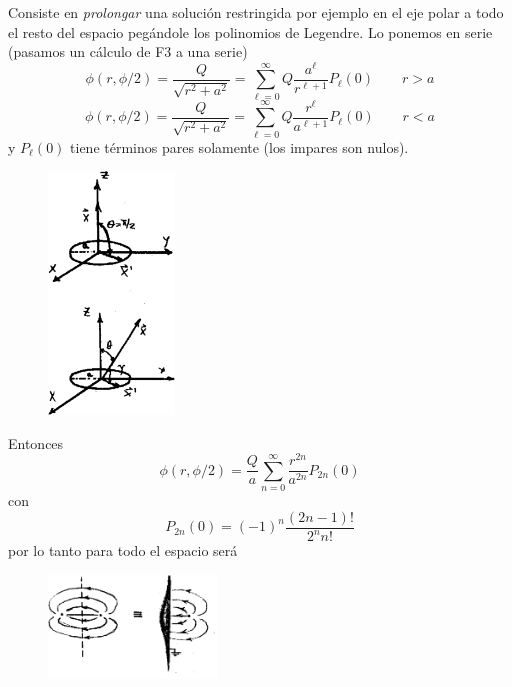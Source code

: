 \documentclass[10pt,oneside]{CBFT_book}
\begin{document}
Consiste en {\it prolongar} una solución restringida por ejemplo en el eje polar a todo el
resto del espacio pegándole los polinomios de Legendre.
Lo ponemos en serie (pasamos un cálculo de F3 a una serie)
\[
	\phi(r,\phi/2) = \frac{Q}{\sqrt{r^2 + a^2}} = \sum_{\ell=0}^\infty Q \frac{a^\ell}{r^{\ell + 1}} 
	P_\ell (0) \qquad r > a
\]
\[
	\phi(r,\phi/2) = \frac{Q}{\sqrt{r^2 + a^2}} = \sum_{\ell=0}^\infty Q \frac{r^\ell}{a^{\ell + 1}} 
	P_\ell (0) \qquad r < a
\]
y $P_\ell(0)$ tiene términos pares solamente (los impares son nulos).

\begin{figure}[htb]
	\begin{center}
	\includegraphics[width=0.3\textwidth]{images/fig_ft1_expansiones2.pdf}	 
	\end{center}
	\caption{}
\end{figure} 

Entonces
\[
	\phi(r,\phi/2) = \frac{Q}{a} \sum_{n=0}^\infty \frac{r^{2n}}{a^{2n}} P_{2n} (0) 
\]
con 
\[
	P_{2n} (0) = (-1)^n \frac{(2n-1)!}{2^n n!}
\]
por lo tanto para todo el espacio será

\begin{figure}[htb]
	\begin{center}
	\includegraphics[width=0.4\textwidth]{images/fig_ft1_expansiones3.pdf}	 
	\end{center}
	\caption{}
\end{figure} 
\end{document}
